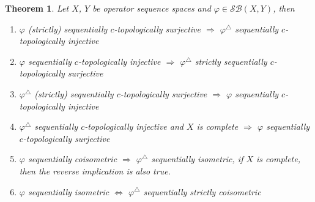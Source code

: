 \documentclass[12pt]{article}
\newtheorem{theorem}{Theorem}[subsection]
\begin{document}
\begin{theorem}\label{ThDualSQOps}
Let $X$, $Y$ be operator sequence spaces and $\varphi\in\mathcal{SB}(X,Y)$, then
\begin{enumerate}
    \item $\varphi$ (strictly) sequentially $c$-topologically surjective 
    $\Longrightarrow$
    $ \varphi^\triangle$ sequentially $c$-topologically injective

    \item $ \varphi$ sequentially $c$-topologically injective $\Longrightarrow$
    $ \varphi^\triangle$ strictly sequentially $c$-topologically surjective

    \item $\varphi^\triangle$ (strictly) sequentially $c$-topologically 
    surjective $\Longrightarrow$
    $ \varphi$ sequentially $c$-topologically injective

    \item $ \varphi^\triangle$ sequentially $c$-topologically injective and 
    $X$ is complete $\Longrightarrow$
    $ \varphi$ sequentially $c$-topologically surjective

    \item $\varphi$ sequentially coisometric $\Longrightarrow$ 
    $\varphi^\triangle$ sequentially isometric, if $X$ is complete, 
    then the reverse implication is also true.

    \item $ \varphi$ sequentially isometric $\Longleftrightarrow$
    $\varphi^\triangle$ sequentially strictly coisometric
\end{enumerate}
\end{theorem}
\end{document}
